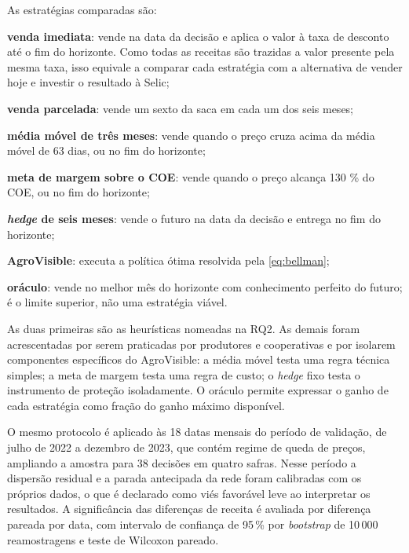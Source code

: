 As estratégias comparadas são:
\begin{alineas}
	\item \textbf{venda imediata}: vende na data da decisão e aplica o valor à taxa de desconto até o fim do horizonte. Como todas as receitas são trazidas a valor presente pela mesma taxa, isso equivale a comparar cada estratégia com a alternativa de vender hoje e investir o resultado à Selic;
	\item \textbf{venda parcelada}: vende um sexto da saca em cada um dos seis meses;
	\item \textbf{média móvel de três meses}: vende quando o preço cruza acima da média móvel de 63 dias, ou no fim do horizonte;
	\item \textbf{meta de margem sobre o COE}: vende quando o preço alcança 130 \% do COE, ou no fim do horizonte;
	\item \textbf{\textit{hedge} de seis meses}: vende o futuro na data da decisão e entrega no fim do horizonte;
	\item \textbf{AgroVisible}: executa a política ótima resolvida pela \autoref{eq:bellman};
	\item \textbf{oráculo}: vende no melhor mês do horizonte com conhecimento perfeito do futuro; é o limite superior, não uma estratégia viável.
\end{alineas}

As duas primeiras são as heurísticas nomeadas na RQ2. As demais foram acrescentadas por serem praticadas por produtores e cooperativas e por isolarem componentes específicos do AgroVisible: a média móvel testa uma regra técnica simples; a meta de margem testa uma regra de custo; o \textit{hedge} fixo testa o instrumento de proteção isoladamente. O oráculo permite expressar o ganho de cada estratégia como fração do ganho máximo disponível.

O mesmo protocolo é aplicado às 18 datas mensais do período de validação, de julho de 2022 a dezembro de 2023, que contém regime de queda de preços, ampliando a amostra para 38 decisões em quatro safras. Nesse período a dispersão residual e a parada antecipada da rede foram calibradas com os próprios dados, o que é declarado como viés favorável leve ao interpretar os resultados. A significância das diferenças de receita é avaliada por diferença pareada por data, com intervalo de confiança de 95\,\% por \textit{bootstrap} de 10\,000 reamostragens e teste de Wilcoxon pareado.

